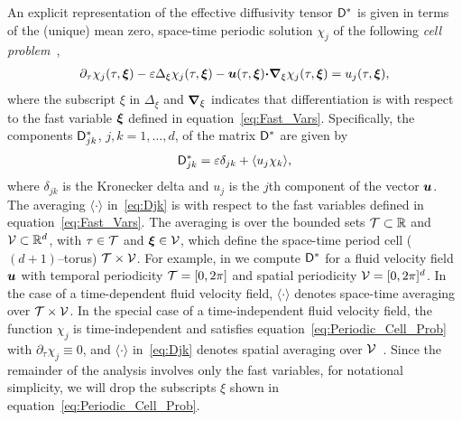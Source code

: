 \documentclass[amsa]{ipart}
\begin{document}
An explicit representation of the
effective diffusivity tensor $\mathsf{D}^*$ is given in terms of the (unique)
mean zero, space-time periodic solution $\chi_j$ of the following
\emph{cell problem}~\cite{Biferale:PF:2725,Majda:Kramer:1999:book}, 
%
\begin{align}\label{eq:Periodic_Cell_Prob}
  \partial_\tau\chi_j(\tau,\vecxi)
  -\varepsilon\Delta_\xi\chi_j(\tau,\vecxi)
  -\vecu(\tau,\vecxi) \bcdot\bnabla_\xi \chi_j(\tau,\vecxi)
  =u_j(\tau,\vecxi),
\end{align}
%
where the subscript $\xi$ in $\Delta_\xi$ and $\mbox{\boldmath${\nabla}$}_\xi$
indicates that differentiation is with respect to the fast variable
$\boldsymbol{\xi}$ defined in equation~\eqref{eq:Fast_Vars}. Specifically,
the components $\mathsf{D}^*_{jk}$, $j,k=1,\ldots,d$, of the matrix $\mathsf{D}^*$ are given
by~\cite{McLaughlin:SIAM_JAM:780,Fannjiang:1994:SIAM_JAM:333,Novikov:2005:CPAM:867,Majda:Kramer:1999:book}          
%
\begin{align}\label{eq:Djk}
  \Dm^*_{jk}=\varepsilon\delta_{jk}+\langle u_j\chi_k\rangle,
\end{align}
%
where $\delta_{jk}$ is the Kronecker delta and $u_j$ is the $j$th component
of the vector $\boldsymbol{u}$. The averaging $\langle\cdot\rangle$ in~\eqref{eq:Djk} is with
respect to the fast variables defined in
equation~\eqref{eq:Fast_Vars}. The averaging is over the bounded
sets $\mathcal{T}\subset\mathbb{R}$ and $\mathcal{V}\subset\mathbb{R}^d$, with $\tau\in\mathcal{T}$ and
$\boldsymbol{\xi}\in\mathcal{V}$, which define the space-time period cell ($(d+1)$--torus)
$\mathcal{T}\times\mathcal{V}$. For example, in  we compute $\mathsf{D}^*$
for a fluid velocity field $\boldsymbol{u}$ with temporal periodicity
$\mathcal{T}=[0,2\pi]$ and spatial periodicity $\mathcal{V}=[0,2\pi]^d$. In the case of a
time-dependent fluid velocity field, $\langle\cdot\rangle$ 
denotes space-time averaging over $\mathcal{T}\times\mathcal{V}$. In the special case of a
time-independent fluid velocity field, the function $\chi_j$ is
time-independent and satisfies equation~\eqref{eq:Periodic_Cell_Prob}
with $\partial_\tau\chi_j\equiv0$, and $\langle\cdot\rangle$ in~\eqref{eq:Djk} denotes spatial averaging over
$\mathcal{V}$~\cite{Fannjiang:1994:SIAM_JAM:333,Novikov:2005:CPAM:867,Majda:Kramer:1999:book}. Since
the remainder of the analysis involves only the fast variables, for
notational simplicity, we will drop the subscripts $\xi$ shown in
equation~\eqref{eq:Periodic_Cell_Prob}. 
\end{document}
